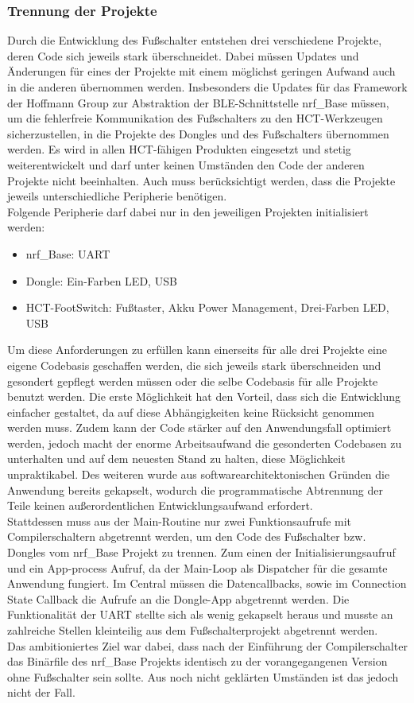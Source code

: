 \subsubsection{Trennung der Projekte}
Durch die Entwicklung des Fußschalter entstehen drei verschiedene Projekte, deren Code sich jeweils stark überschneidet. Dabei müssen Updates und Änderungen für eines der Projekte mit einem möglichst geringen Aufwand auch in die anderen übernommen werden. Insbesonders die Updates für das Framework der Hoffmann Group zur Abstraktion der \ac{BLE}-Schnittstelle nrf\_Base müssen, um die fehlerfreie Kommunikation des Fußschalters zu den \ac{HCT}-Werkzeugen sicherzustellen, in die Projekte des Dongles und des Fußschalters übernommen werden. Es wird in allen \ac{HCT}-fähigen Produkten eingesetzt und stetig weiterentwickelt und darf unter keinen Umständen den Code der anderen Projekte nicht beeinhalten. Auch muss berücksichtigt werden, dass die Projekte jeweils unterschiedliche Peripherie benötigen.\\
Folgende Peripherie darf dabei nur in den jeweiligen Projekten initialisiert werden:
\begin{itemize}
	\item nrf\_Base: \ac{UART}
	\item Dongle: Ein-Farben LED, \ac{USB}
	\item \ac{HCT}-FootSwitch: Fußtaster, Akku Power Management, Drei-Farben LED, \ac{USB}
\end{itemize}

Um diese Anforderungen zu erfüllen kann einerseits für alle drei Projekte eine eigene Codebasis geschaffen werden, die sich jeweils stark überschneiden und gesondert gepflegt werden müssen oder die selbe Codebasis für alle Projekte benutzt werden. Die erste Möglichkeit hat den Vorteil, dass sich die Entwicklung einfacher gestaltet, da auf diese Abhängigkeiten keine Rücksicht genommen werden muss. Zudem kann der Code stärker auf den Anwendungsfall optimiert werden, jedoch macht der enorme Arbeitsaufwand die gesonderten Codebasen zu unterhalten und auf dem neuesten Stand zu halten, diese Möglichkeit unpraktikabel. Des weiteren wurde aus softwarearchitektonischen Gründen die Anwendung bereits gekapselt, wodurch die programmatische Abtrennung der Teile keinen außerordentlichen Entwicklungsaufwand erfordert.\\
Stattdessen muss aus der Main-Routine nur zwei Funktionsaufrufe mit Compilerschaltern abgetrennt werden, um den Code des Fußschalter bzw. Dongles vom nrf\_Base Projekt zu trennen. Zum einen der Initialisierungsaufruf und ein App-process Aufruf, da der Main-Loop als Dispatcher für die gesamte Anwendung fungiert. Im Central müssen die Datencallbacks, sowie im Connection State Callback die Aufrufe an die Dongle-App abgetrennt werden. Die Funktionalität der \ac{UART} stellte sich als wenig gekapselt heraus und musste an zahlreiche Stellen kleinteilig aus dem Fußschalterprojekt abgetrennt werden.\\ 
Das ambitioniertes Ziel war dabei, dass nach der Einführung der Compilerschalter das Binärfile des nrf\_Base Projekts identisch zu der vorangegangenen Version ohne Fußschalter sein sollte. Aus noch nicht geklärten Umständen ist das jedoch nicht der Fall.


